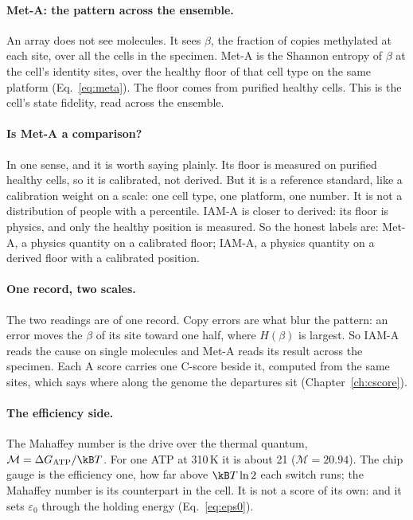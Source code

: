 \paragraph{Met-A: the pattern across the ensemble.} An array does not see molecules. It sees $\beta$, the fraction of copies methylated at
each site, over all the cells in the specimen. Met-A is the Shannon entropy of $\beta$ at the cell's identity sites, over the healthy floor of
that cell type on the same platform (Eq.~\eqref{eq:meta}). The floor comes from purified healthy cells. \calibrated{} This is the cell's state
fidelity, read across the ensemble.

\paragraph{Is Met-A a comparison?} In one sense, and it is worth saying plainly. Its floor is measured on purified healthy cells, so it is
calibrated, not derived. But it is a reference standard, like a calibration weight on a scale: one cell type, one platform, one number. It is not
a distribution of people with a percentile. IAM-A is closer to derived: its floor is physics, and only the healthy position is measured. So the
honest labels are: Met-A, a physics quantity on a calibrated floor; IAM-A, a physics quantity on a derived floor with a calibrated position.

\paragraph{One record, two scales.} The two readings are of one record. Copy errors are what blur the pattern: an error moves the $\beta$ of
its site toward one half, where $H(\beta)$ is largest. \derived{} So IAM-A reads the cause on single molecules and Met-A reads its result
across the specimen. Each A score carries one C-score beside it, computed from the same sites, which says where along the genome the
departures sit (Chapter~\ref{ch:cscore}). \calc

\paragraph{The efficiency side.} The Mahaffey number is the drive over the thermal quantum, $\mathcal M=\Delta G_{\rm ATP}/\kB T$. For one
ATP at 310\,K it is about 21 ($\mathcal M=20.94$). \calc{} The chip gauge is the efficiency one, how far above $\kB T\ln2$ each switch runs; the Mahaffey number is its counterpart in the cell. It is not a score of its own: and it sets $\varepsilon_0$ through
the holding energy (Eq.~\eqref{eq:eps0}). \derived

